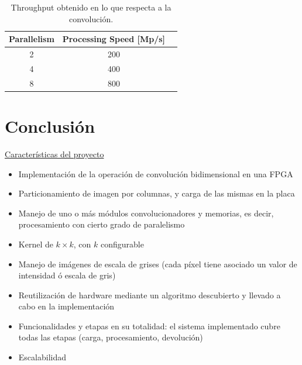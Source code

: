 \documentclass[a4paper]{article}
\begin{document}
\begin{table}[H]
\renewcommand{\arraystretch}{1.3}
\caption{Throughput obtenido en lo que respecta a la convolución.}
\label{conv_tp}
\centering
\begin{tabular}{|c|c|c|}
 \hline
  \textbf{Parallelism}  &    \textbf{Processing Speed [Mp/s]}  \\ \hline
          2             &                     200              \\ \hline
          4             &                     400              \\ \hline
          8             &                     800              \\ \hline
\end{tabular}           
\end{table}


\section{Conclusión}  \label{conclusion_sec}

\underline{Características del proyecto}
\begin{frame}{}
    
      \begin{itemize}
        \item Implementación de la operación de convolución bidimensional en una FPGA
        \item Particionamiento de imagen por columnas, y carga de las mismas en la placa
        \item Manejo de uno o más módulos convolucionadores y memorias, es decir, procesamiento con cierto grado de paralelismo
        \item Kernel de $ k \times k$, con $k$ configurable
        \item Manejo de imágenes de escala de grises (cada píxel tiene asociado un valor de intensidad ó escala de gris)
        \item Reutilización de hardware mediante un algoritmo descubierto y llevado a cabo en la implementación
        \item Funcionalidades y etapas en su totalidad: el sistema implementado cubre todas las etapas (carga, procesamiento, devolución)
        \item Escalabilidad
      \end{itemize}
    
\end{frame}
\end{document}
